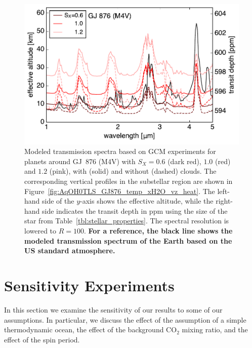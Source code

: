 \documentclass[11pt,numberedappendix,twocolappendix,]{emulateapj}
\def\revise#1{{\bf #1}}
\begin{document}
\begin{figure}[!h]
    \begin{center}
    \includegraphics[width=\hsize]{transit_GJ876_USstandard.pdf}
    \end{center}
\caption{Modeled transmission spectra based on GCM experiments for planets around GJ~876 (M4V) with $S_X=0.6$ (dark red), $1.0$ (red) and $1.2$ (pink), with (solid) and without (dashed) clouds. The corresponding vertical profiles in the substellar region are shown in Figure~\ref{fig:AqOH0TLS_GJ876_temp_xH2O_vz_heat}. The left-hand side of the $y$-axis shows the effective altitude, while the right-hand side indicates the transit depth in ppm using the size of the star from Table~\ref{tbl:stellar_properties}. The spectral resolution is lowered to $R=100$. 
\revise{For a reference, the black line shows the modeled transmission spectrum of the Earth based on the US standard atmosphere. }}
\label{fig:transmission}
\end{figure}


\section{Sensitivity Experiments }
\label{s:sensitivity}

In this section we examine the sensitivity of our results to some of our assumptions. 
In particular, we discuss the effect of the assumption of a simple thermodynamic ocean, the effect of the background CO$_2$ mixing ratio, and the effect of the spin period. 
\end{document}
